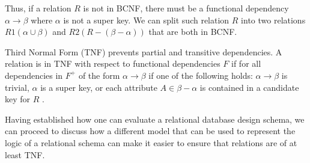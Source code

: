 Thus, if a relation $R$ is not in BCNF, there must be a functional dependency $\alpha \rightarrow \beta$ where $\alpha$ is not a super key. 
We can split such relation $R$ into two relations $R1(\alpha \cup \beta)$ and $R2(R-(\beta-\alpha))$ that are both in BCNF.

Third Normal Form (TNF) prevents partial and transitive dependencies\cite{MontayaNormalForms}.
A relation is in TNF with respect to functional dependencies $F$ if for all dependencies in $F^+$ of the form $\alpha \rightarrow \beta$ if one of the following holds: 
$\alpha \rightarrow \beta$ is trivial, $\alpha$ is a super key, or each attribute $A \in \beta-\alpha$ is contained in a candidate key for $R$ \cite{DBSBook}.

Having established how one can evaluate a relational database design schema, we can proceed to discuss how a different model that can be used to represent the logic of a relational schema can make it easier to ensure that relations are of at least TNF.

